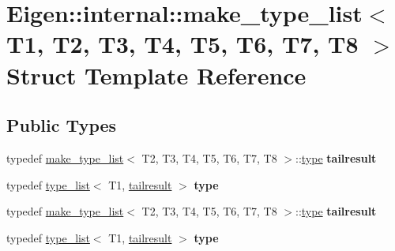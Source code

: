 \hypertarget{struct_eigen_1_1internal_1_1make__type__list}{}\section{Eigen\+:\+:internal\+:\+:make\+\_\+type\+\_\+list$<$ T1, T2, T3, T4, T5, T6, T7, T8 $>$ Struct Template Reference}
\label{struct_eigen_1_1internal_1_1make__type__list}
\subsection*{Public Types}
\begin{DoxyCompactItemize}
\item 
\mbox{\label{struct_eigen_1_1internal_1_1make__type__list_ad9a9f442981d8ee46abdd359374aa45a}} 
typedef \hyperlink{struct_eigen_1_1internal_1_1make__type__list}{make\+\_\+type\+\_\+list}$<$ T2, T3, T4, T5, T6, T7, T8 $>$\+::\hyperlink{struct_eigen_1_1internal_1_1type__list}{type} {\bfseries tailresult}
\item 
\mbox{\label{struct_eigen_1_1internal_1_1make__type__list_a9c23bcfdbbbc86bb8992f53c37bab34f}} 
typedef \hyperlink{struct_eigen_1_1internal_1_1type__list}{type\+\_\+list}$<$ T1, \hyperlink{struct_eigen_1_1internal_1_1type__list}{tailresult} $>$ {\bfseries type}
\item 
\mbox{\label{struct_eigen_1_1internal_1_1make__type__list_ad9a9f442981d8ee46abdd359374aa45a}} 
typedef \hyperlink{struct_eigen_1_1internal_1_1make__type__list}{make\+\_\+type\+\_\+list}$<$ T2, T3, T4, T5, T6, T7, T8 $>$\+::\hyperlink{struct_eigen_1_1internal_1_1type__list}{type} {\bfseries tailresult}
\item 
\mbox{\label{struct_eigen_1_1internal_1_1make__type__list_a9c23bcfdbbbc86bb8992f53c37bab34f}} 
typedef \hyperlink{struct_eigen_1_1internal_1_1type__list}{type\+\_\+list}$<$ T1, \hyperlink{struct_eigen_1_1internal_1_1type__list}{tailresult} $>$ {\bfseries type}
\end{DoxyCompactItemize}


